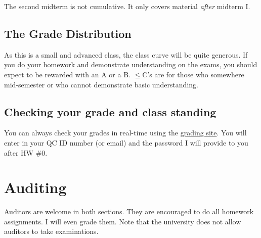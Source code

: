 \documentclass[12pt]{article}
\begin{document}
\noindent The second midterm is not cumulative. It only covers material \textit{after} midterm I.


\subsection*{The Grade Distribution}

As this is a small and advanced class, the class curve will be quite generous. If you do your homework and demonstrate understanding on the exams, you should expect to be rewarded with an A or a B. $\leq$C's are for those who  somewhere mid-semester or who cannot demonstrate basic understanding.

\subsection*{Checking your grade and class standing}

You can always check your grades in real-time using the \href{http://gradesly.com}{grading site}. You will enter in your QC ID number (or email) and the password I will provide to you after HW \#0.

\section*{Auditing}

Auditors are welcome in both sections. They are encouraged to do all homework assignments. I will even grade them. Note that the university does not allow auditors to take examinations.
\end{document}
